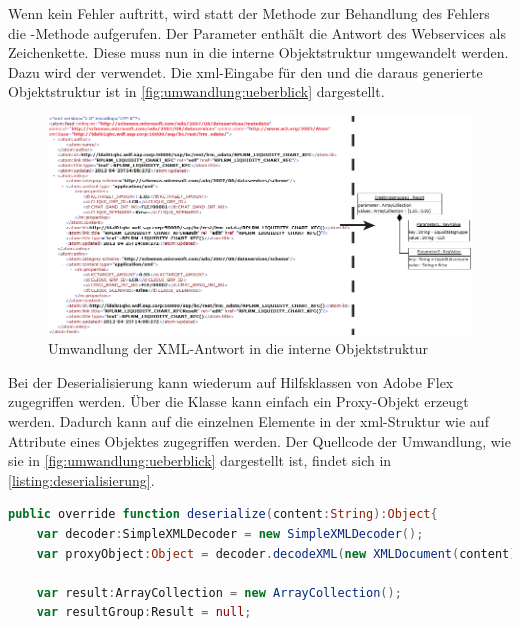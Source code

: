 \begin{onehalfspacing}
Wenn kein Fehler auftritt, wird statt der Methode zur Behandlung des Fehlers die -Methode aufgerufen. Der Parameter  enthält die Antwort des Webservices als Zeichenkette. Diese muss nun in die interne Objektstruktur umgewandelt werden. Dazu wird der  verwendet. Die \gls{xml}-Eingabe für den  und die daraus generierte Objektstruktur ist in \vref{fig:umwandlung:ueberblick} dargestellt.

\begin{figure}[ht]
\centering
\setlength{\unitlength}{1mm}
\includegraphics[width=15cm]{images/Abbildung21-Umwandlung.pdf}
\caption{Umwandlung der XML-Antwort in die interne Objektstruktur\label{fig:umwandlung:ueberblick}}
\end{figure}

Bei der Deserialisierung kann wiederum auf Hilfsklassen von Adobe Flex zugegriffen werden. Über die Klasse  kann einfach ein Proxy-Objekt erzeugt werden. Dadurch kann auf die einzelnen Elemente in der \gls{xml}-Struktur wie auf Attribute eines Objektes zugegriffen werden. Der Quellcode der Umwandlung, wie sie in \vref{fig:umwandlung:ueberblick} dargestellt ist, findet sich in \vref{listing:deserialisierung}.


\begin{programm}[ht]
\begin{lstlisting}[language=ActionScript]
public override function deserialize(content:String):Object{			
	var decoder:SimpleXMLDecoder = new SimpleXMLDecoder();
	var proxyObject:Object = decoder.decodeXML(new XMLDocument(content));
	
	var result:ArrayCollection = new ArrayCollection();
	var resultGroup:Result = null;			
			

\end{lstlisting}
\end{programm}
\end{onehalfspacing}
